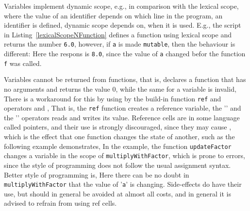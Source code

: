 Variables implement dynamic scope, e.g., in comparison with the lexical scope, where the value of an identifier depends on which line in the program, an identifier is defined, dynamic scope depends on, when it is used. E.g., the script in Listing~\ref{lexicalScopeNFunction} defines a function using lexical scope and returns the number \lstinline!6.0!, however, if \lstinline!a! is made \lstinline!mutable!, then the behaviour is different:
%
%
Here the respons is \lstinline!8.0!, since the value of \lstinline!a! changed befor the function \lstinline!f! was called.
 
Variables cannot be returned from functions, that is,
%
%
declares a function that has no arguments and returns the value 0, while the same for a variable is invalid,
%
%
There is a workaround for this by using  by the build-in function \texttt{ref} and operators \lexeme{!} and \lexeme{:=},
%
%
That is, the \texttt{ref} function creates a reference variable, the '\lexeme{!}' and the '\lexeme{:=}' operators reads and writes its value. Reference cells are in some language called pointers, and their use is strongly discouraged, since they may cause , which is the effect that one function changes the state of another, such as the following example demonstrates,
%
%
In the example, the function \texttt{updateFactor} changes a variable in the scope of \texttt{multiplyWithFactor}, which is prone to errors, since the style of programming does not follow the usual assignment syntax. Better style of programming is,
%
%
Here there can be no doubt in \texttt{multiplyWithFactor} that the value of '\texttt{a}' is changing. Side-effects do have their use, but should in general be avoided at almost all costs, and in general it is advised to refrain from using ref cells.


